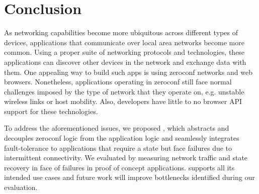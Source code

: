 \section{Conclusion}
\label{sec:conclusion}

As networking capabilities become more ubiquitous across different types of devices, applications that communicate over local area networks become more common.
Using a proper suite of networking protocols and technologies, these applications can discover other devices in the network and exchange data with them.
One appealing way to build such apps is using zeroconf networks and web browsers.
Nonetheless, applications operating in zeroconf still face normal challenges imposed by the type of network that they operate on, e.g. 
unstable wireless links or host mobility. Also, developers have little to no browser API support for these technologies.


To address the aforementioned issues, we proposed \APINameNoSpace, which abstracts and decouples zeroconf logic from the application logic and seamlessly integrates fault-tolerance to applications that require a state but face failures due to intermittent connectivity. We evaluated \APIName by measuring network traffic and state recovery in face of failures in proof of concept applications. \APIName supports all its intended use cases and future work will improve bottlenecks identified during our evaluation.
